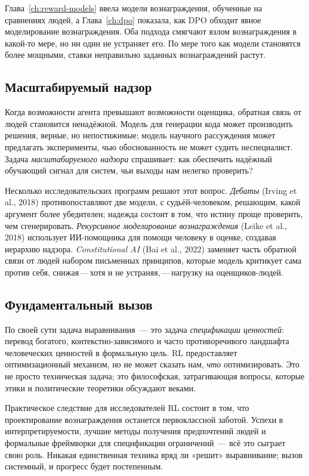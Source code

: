 Глава~\ref{ch:reward-models} ввела модели вознаграждения, обученные на
сравнениях людей, а Глава~\ref{ch:dpo} показала, как DPO обходит
явное моделирование вознаграждения. Оба подхода смягчают взлом вознаграждения в
какой-то мере, но ни один не устраняет его. По мере того как модели становятся более
мощными, ставки неправильно заданных вознаграждений растут.

\subsection{Масштабируемый надзор}

Когда возможности агента превышают возможности оценщика, обратная связь от людей
становится ненадёжной. Модель для генерации кода может производить решения, верные, но непостижимые;
модель научного рассуждения может предлагать эксперименты, чью обоснованность
не может судить неспециалист. Задача \emph{масштабируемого надзора} спрашивает:
как обеспечить надёжный обучающий сигнал для систем, чьи выходы нам нелегко проверить?

Несколько исследовательских программ решают этот вопрос. \emph{Дебаты}
(Irving et al., 2018) противопоставляют две модели, с
судьёй-человеком, решающим, какой аргумент более убедителен; надежда
состоит в том, что истину проще проверить, чем сгенерировать.
\emph{Рекурсивное моделирование вознаграждения} (Leike et al., 2018) использует
ИИ-помощника для помощи человеку в оценке, создавая иерархию
надзора. \emph{Constitutional AI} (Bai et al., 2022) заменяет
часть обратной связи от людей набором письменных принципов, которые модель
критикует сама против себя, снижая\,---\,хотя и не
устраняя,\,---\,нагрузку на оценщиков-людей.

\subsection{Фундаментальный вызов}

По своей сути задача выравнивания~--- это задача \emph{спецификации
ценностей}: перевод богатого,
контекстно-зависимого и часто противоречивого ландшафта человеческих ценностей
в формальную цель. RL предоставляет оптимизационный механизм, но
не может сказать нам, \emph{что} оптимизировать. Это не просто
техническая задача; это философская, затрагивающая вопросы,
которые этики и политические теоретики обсуждают веками.

Практическое следствие для исследователей RL состоит в том, что проектирование вознаграждения
останется первоклассной заботой. Успехи в интерпретируемости,
лучшие методы получения предпочтений людей и формальные фреймворки
для спецификации ограничений~--- всё это сыграет свою роль. Никакая единственная техника
вряд ли «решит» выравнивание; вызов системный, и
прогресс будет постепенным.


